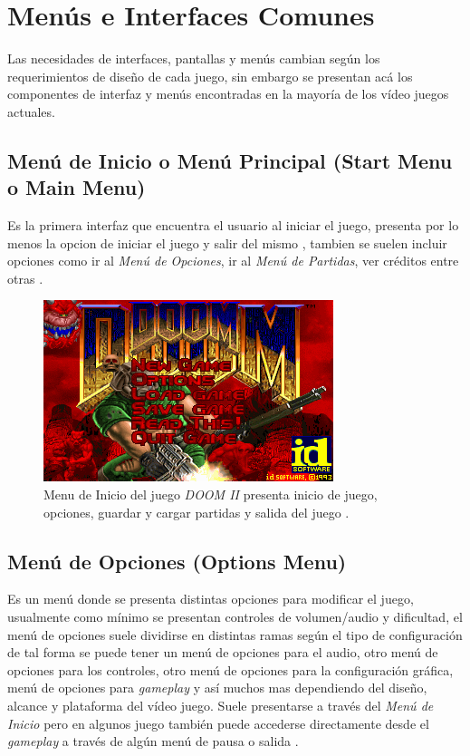 \section{Menús e Interfaces Comunes}
Las necesidades de interfaces, pantallas y menús cambian según los requerimientos de diseño de cada juego, sin embargo se presentan acá los componentes de interfaz y menús encontradas en la mayoría de los vídeo juegos actuales.
\subsection{Menú de Inicio o Menú Principal (Start Menu o Main Menu)}
Es la primera interfaz que encuentra el usuario al iniciar el juego, presenta por lo menos la opcion de iniciar el juego y salir del mismo \cite[p.~28]{jenkinscreatinggames}, tambien se suelen incluir opciones como ir al \emph{Menú de Opciones}, ir al \emph{Menú de Partidas}, ver créditos entre otras \cite{mainmenu}.~\\

\begin{figure}[H]
\centering
\includegraphics[width=0.55\linewidth]{semana8/doom_start.png} 
\caption{Menu de Inicio del juego \emph{DOOM II} presenta inicio de juego, opciones, guardar y cargar partidas y salida del juego \cite{doomii}.}
\end{figure}

\subsection{Menú de Opciones (Options Menu)}
Es un menú donde se presenta distintas opciones para modificar el juego, usualmente como mínimo se presentan controles de volumen/audio y dificultad, el menú de opciones suele dividirse en distintas ramas según el tipo de configuración de tal forma se puede tener un menú de opciones para el audio, otro menú de opciones para los controles, otro menú de opciones para la configuración gráfica, menú de opciones para \emph{gameplay} y así muchos mas dependiendo del diseño, alcance y plataforma del vídeo juego. Suele presentarse a través del \emph{Menú de Inicio} pero en algunos juego también puede accederse directamente desde el \emph{gameplay} a través de algún menú de pausa o salida \cite{gb_optionsmenu}.

